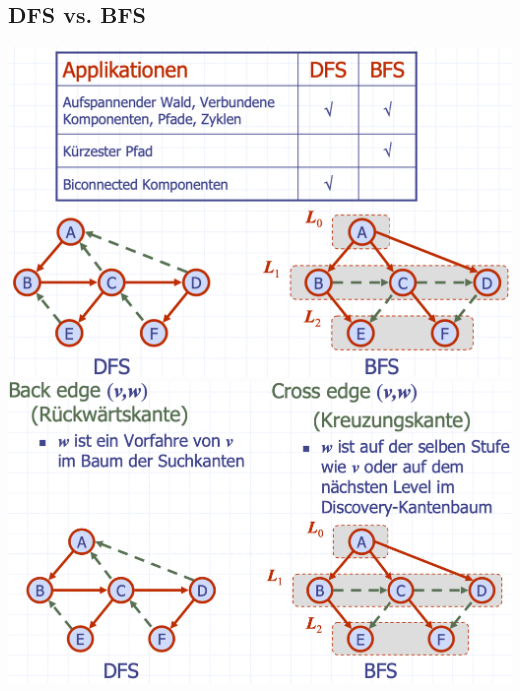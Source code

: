 \subsection{DFS vs. BFS}
\begin{center}
    \includegraphics[scale=.25]{graphic/13 BFS/DFS vs. BFS1.png}
    \includegraphics[scale=.25]{graphic/13 BFS/DFS vs. BFS2.png}
\end{center}
\vspace{-8pt}

\newpage